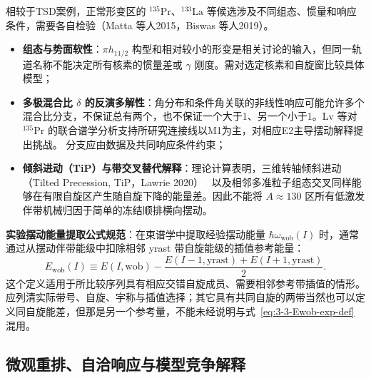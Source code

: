 相较于TSD案例，正常形变区的 $^{135}\mathrm{Pr}$、$^{133}\mathrm{La}$ 等候选涉及不同组态、惯量和响应条件，需要各自检验（Matta 等人2015，Biswas 等人2019）。~\cite{matta-2015-transverse-wobbling-135pr,biswas-2019-longitudinal-wobbling-133la}
\begin{itemize}
\item \textbf{组态与势面软性}：$\pi h_{11/2}$ 构型和相对较小的形变是相关讨论的输入，但同一轨道名称不能决定所有核素的惯量差或 $\gamma$ 刚度。需对选定核素和自旋窗比较具体模型；
\item \textbf{多极混合比 $\delta$ 的反演多解性}：角分布和条件角关联的非线性响应可能允许多个混合比分支，不保证总有两个，也不保证一个大于1、另一个小于1。Lv 等对 $^{135}\mathrm{Pr}$ 的联合谱学分析支持所研究连接线以M1为主，对相应E2主导摆动解释提出挑战。\cite{lv-2022-evidence-against-wobbling-135pr} 分支应由数据及共同响应条件约束；
\item \textbf{倾斜进动（TiP）与带交叉替代解释}：理论计算表明，三维转轴倾斜进动（Tilted Precession, TiP，Lawrie 2020）~\cite{lawrie-2020-tilted-precession-wobbling} 以及相邻多准粒子组态交叉同样能够在有限自旋区产生随自旋下降的能量差。因此不能将 $A \approx 130$ 区所有低激发伴带机械归因于简单的冻结顺排横向摆动。
\end{itemize}

\textbf{实验摆动能量提取公式规范}：在束谱学中提取经验摆动能量 $\hbar \omega_{\text{wob}}(I)$ 时，通常通过从摆动伴带能级中扣除相邻 yrast 带自旋能级的插值参考能量：
\begin{equation}\label{eq:3-3-Ewob-exp-def}
E_{\text{wob}}(I) \equiv E(I, \text{wob}) - \frac{E(I-1, \text{yrast}) + E(I+1, \text{yrast})}{2}.
\end{equation}
这个定义适用于所比较序列具有相应交错自旋成员、需要相邻参考带插值的情形。应列清实际带号、自旋、宇称与插值选择；其它具有共同自旋的两带当然也可以定义同自旋能差，但那是另一个参考量，不能未经说明与式~\eqref{eq:3-3-Ewob-exp-def} 混用。

\subsection{微观重排、自洽响应与模型竞争解释}\label{sec:3-3-5}

